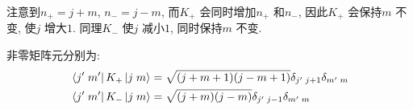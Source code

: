 \begin{exercise}[3.23]
  注意到$n_{+} = j+m$, $n_{-} = j-m$, 而$K_{+}$ 会同时增加$n_{+}$ 
  和$n_{-}$, 因此$K_{+}$ 会保持$m$ 不变, 使$j$ 增大$1$.
  同理$K_{-}$ 使$j$ 减小$1$, 同时保持$m$ 不变.

  非零矩阵元分别为:
  \begin{equation}
    \begin{aligned}
      &\bra{j'\;m'}K_{+}\ket{j\;m} = \sqrt{(j+m+1)(j-m+1)}\delta_{j'\;j+1}\delta_{m'\;m}\\
      &\bra{j'\;m'}K_{-}\ket{j\;m} = \sqrt{(j+m)(j-m)}\delta_{j'\;j-1}\delta_{m'\;m}
    \end{aligned}
  \end{equation}
\end{exercise}
